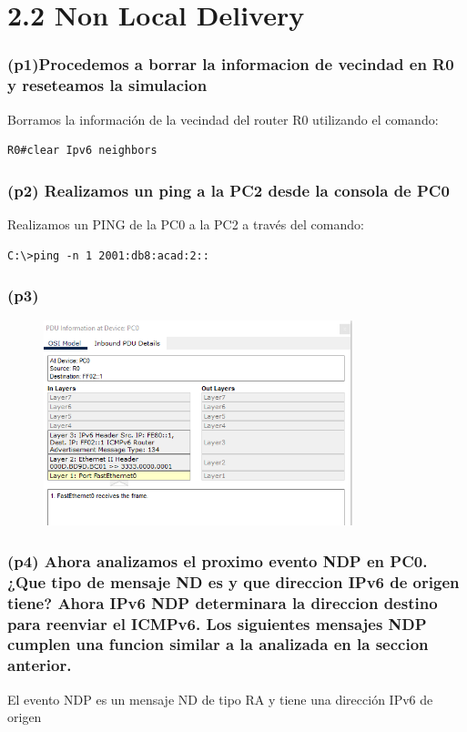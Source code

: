 \documentclass{article}
\begin{document}
\section*{2.2 Non Local Delivery}

\subsubsection*{(p1)Procedemos a borrar la informacion de vecindad en R0 y reseteamos la simulacion} Borramos la información de la vecindad del router R0 utilizando el comando:
\begin{lstlisting}
R0#clear Ipv6 neighbors
\end{lstlisting}

\subsubsection*{(p2) Realizamos un ping a la PC2 desde la consola de PC0} Realizamos un PING de la PC0 a la PC2 a través del comando:
\begin{lstlisting}
C:\>ping -n 1 2001:db8:acad:2::
\end{lstlisting}

\subsubsection*{(p3)} 
\begin{figure}[h]
    \centering
    \includegraphics[width=0.8\textwidth]{23.png}
\end{figure}


\subsubsection*{(p4) Ahora analizamos el proximo evento NDP en PC0. ¿Que tipo de mensaje ND es y que direccion IPv6 de origen tiene? Ahora IPv6 NDP determinara la direccion destino para reenviar el ICMPv6. Los siguientes mensajes NDP cumplen una funcion similar a la analizada en la seccion anterior.} 
El evento NDP es un mensaje ND de tipo RA y tiene una dirección IPv6 de origen 
\end{document}
